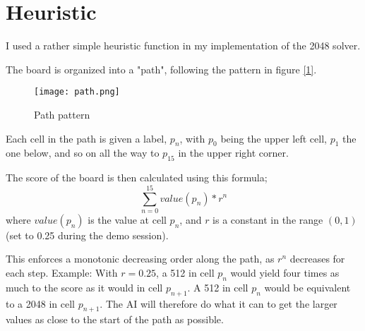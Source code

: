 \documentclass{article}
\begin{document}
\section{Heuristic}
I used a rather simple heuristic function in my implementation of the 2048 solver.

The board is organized into a "path", following the pattern in figure \hyperref[fig:path]{[\ref*{fig:path}]}.
\begin{figure}[H]
	\centering	
	\texttt{[image: path.png]}
	\caption{Path pattern}
	\label{fig:path}
\end{figure}
Each cell in the path is given a label, $p_n$, with $p_0$ being the upper left cell, $p_1$ the one below, and so on all the way to $p_{15}$ in the upper right corner.

The score of the board is then calculated using this formula;
\begin{equation}
	\sum\limits_{n=0}^{15}value(p_n)*r^n
\end{equation}
where $value(p_n)$ is the value at cell $p_n$, and $r$ is a constant in the range $(0, 1)$ (set to 0.25 during the demo session).

This enforces a monotonic decreasing order along the path, as $r^n$ decreases for each step. Example: With $r=0.25$, a 512 in cell $p_n$ would yield four times as much to the score as it would in cell $p_{n+1}$. A 512 in cell $p_n$ would be equivalent to a 2048 in cell $p_{n+1}$. The AI will therefore do what it can to get the larger values as close to the start of the path as possible.

\end{document}
